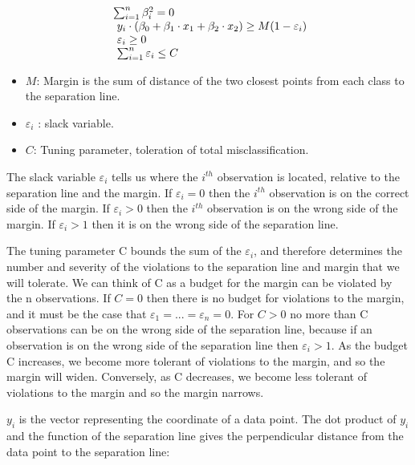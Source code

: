 \documentclass[10pt,letterpaper]{article}
\providecommand{\tightlist}{%
  \setlength{\itemsep}{0pt}\setlength{\parskip}{0pt}}
\begin{document}
\begin{equation}
  \left.
  \begin{array}{l@{\,}l}
     \sum_{i=1}^n \beta_i^2 = 0 \\
     \ y_i \cdot ( \beta_0 + \beta_1 \cdot x_1 + \beta_2 \cdot x_2 ) \geq M(1-\varepsilon_i) \\
     \ \varepsilon_i \geq 0 \\
     \ \sum_{i=1}^n \varepsilon_i \leq C \\
  \end{array}
  \right.
\end{equation}

\begin{itemize}
\tightlist
\item
  \(M\): Margin is the sum of distance of the two closest points from
  each class to the separation line.
\item
  \(\varepsilon_i\) : slack variable.
\item
  \(C\): Tuning parameter, toleration of total misclassification.
\end{itemize}

The slack variable \(\varepsilon_i\) tells us where the \(i^{th}\)
observation is located, relative to the separation line and the margin.
If \(\varepsilon_i = 0\) then the \(i^{th}\) observation is on the
correct side of the margin. If \(\varepsilon_i > 0\) then the \(i^{th}\)
observation is on the wrong side of the margin. If \(\varepsilon_i > 1\)
then it is on the wrong side of the separation line.

The tuning parameter C bounds the sum of the \(\varepsilon_i\), and
therefore determines the number and severity of the violations to the
separation line and margin that we will tolerate. We can think of C as a
budget for the margin can be violated by the n observations. If
\(C = 0\) then there is no budget for violations to the margin, and it
must be the case that \(\varepsilon_1 = . . . = \varepsilon_n = 0\). For
\(C > 0\) no more than C observations can be on the wrong side of the
separation line, because if an observation is on the wrong side of the
separation line then \(\varepsilon_i > 1\). As the budget C increases,
we become more tolerant of violations to the margin, and so the margin
will widen. Conversely, as C decreases, we become less tolerant of
violations to the margin and so the margin narrows.

\(y_i\) is the vector representing the coordinate of a data point. The
dot product of \(y_i\) and the function of the separation line gives the
perpendicular distance from the data point to the separation line:
\end{document}

